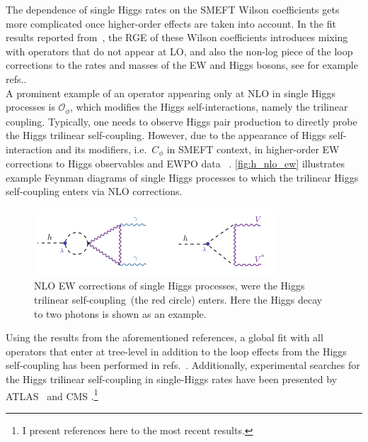 The dependence of single Higgs rates on the SMEFT Wilson coefficients gets more complicated once higher-order effects are taken into account. In the fit results reported from~\cite{Dawson:2020oco}, the RGE of these Wilson coefficients introduces mixing with operators that do not appear at LO, and also the non-log piece of the loop corrections to the rates and masses of the EW and Higgs bosons, see for example refs.\cite{Passarino:2012cb,Degrassi:2016wml,Kribs:2017znd}. \\ A prominent example of an operator appearing only at NLO in single Higgs processes is $\mathcal O_\phi$, which modifies the Higgs self-interactions, namely the trilinear coupling. 
Typically, one needs to observe Higgs pair production to directly probe the Higgs trilinear self-coupling. However, due to the appearance of Higgs self-interaction and its modifiers, i.e.~$C_\phi$ in SMEFT context, in higher-order EW corrections to Higgs observables and EWPO data~ \cite{McCullough:2013rea, Gorbahn:2016uoy, Degrassi:2016wml, Bizon:2016wgr ,Kribs:2017znd,Maltoni:2017ims, Degrassi:2019yix, Degrassi:2021uik, Haisch:2021hvy}. \autoref{fig:h_nlo_ew} illustrates example Feynman diagrams of single Higgs processes to which the trilinear Higgs self-coupling enters via NLO corrections.
\begin{figure}[htpb!]
	\begin{center}
		\includegraphics[width=0.8\textwidth]{figures/htoaa_nlo_ew}
		\caption{NLO EW corrections of single Higgs processes,  were the Higgs trilinear self-coupling~(the red circle) enters. Here the Higgs decay to two photons is shown as an example. \label{fig:h_nlo_ew} }
	\end{center}
\end{figure}
Using the results from the aforementioned references, a global fit with all operators that enter at tree-level in addition to the loop effects from the Higgs self-coupling has been performed in refs.~\cite{DiVita:2017eyz,Dawson:2020oco}. Additionally, experimental searches for the Higgs trilinear self-coupling in single-Higgs rates have been presented by ATLAS~\cite{ATLAS:2019pbo} and CMS \cite{CMS:2020gsy}.\footnote{I present references here to the most recent results.} 
